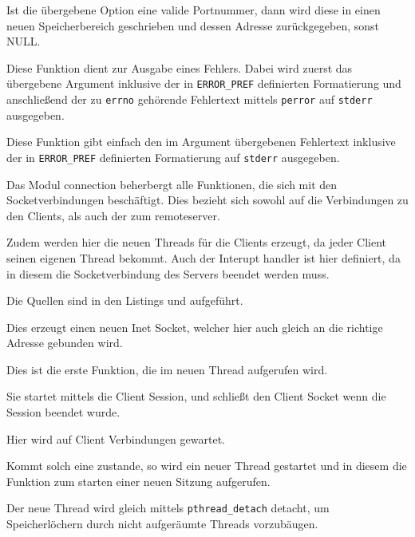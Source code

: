 Ist die \"{u}bergebene Option eine valide Portnummer, dann wird diese in einen neuen Speicherbereich geschrieben und dessen Adresse zur\"{u}ckgegeben, sonst NULL.

\label{fn:put_err}
Diese Funktion dient zur Ausgabe eines Fehlers. Dabei wird zuerst das \"{u}bergebene Argument inklusive der in \texttt{ERROR\_PREF} definierten Formatierung und anschließend der zu \texttt{errno} geh\"{o}rende Fehlertext mittels \texttt{perror} auf \texttt{stderr} ausgegeben.

\label{fn:put_err_str}
Diese Funktion gibt einfach den im Argument \"{u}bergebenen Fehlertext inklusive der in \texttt{ERROR\_PREF} definierten Formatierung auf \texttt{stderr} ausgegeben.

\label{mod:connection}
Das Modul connection beherbergt alle Funktionen, die sich mit den Socketverbindungen besch\"{a}ftigt. Dies bezieht sich sowohl auf die Verbindungen zu den Clients, als auch der zum remoteserver.

Zudem werden hier die neuen Threads f\"{u}r die Clients erzeugt, da jeder Client seinen eigenen Thread bekommt. Auch der Interupt handler ist hier definiert, da in diesem die Socketverbindung des Servers beendet werden muss.

Die Quellen sind in den Listings  und  aufgef\"{u}hrt.




\label{fn:create_socket}
Dies erzeugt einen neuen Inet Socket, welcher hier auch gleich an die richtige Adresse gebunden wird.

\label{fn:process_client}
Dies ist die erste Funktion, die im neuen Thread aufgerufen wird.

Sie startet mittels  die Client Session, und schließt den Client Socket wenn die Session beendet wurde.

\label{fn:wait_connect}
Hier wird auf Client Verbindungen gewartet. 

Kommt solch eine zustande, so wird ein neuer Thread gestartet und in diesem die Funktion  zum starten einer neuen Sitzung aufgerufen.

Der neue Thread wird gleich mittels \texttt{pthread\_detach} detacht, um Speicherl\"{o}chern durch nicht aufger\"{a}umte Threads vorzub\"{a}ugen.

